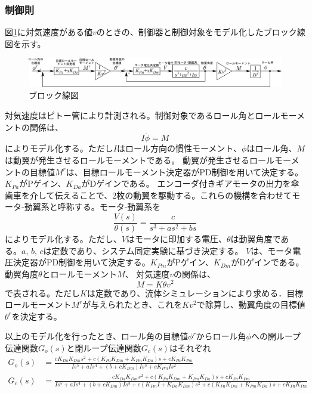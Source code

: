 \documentclass[a4paper,11pt,uplatex]{jsarticle}
\begin{document}
\subsubsection{制御則}
図\ref{fig:ブロック線図}に対気速度がある値$v$のときの、制御器と制御対象をモデル化したブロック線図を示す。
\begin{figure}[H]
	\centering
	\includegraphics[width=0.95\linewidth]{pic_avi/block_diagram.png}
	\caption{ブロック線図}
	\label{fig:ブロック線図}
\end{figure}
対気速度はピトー管により計測される。制御対象であるロール角とロールモーメントの関係は、
\begin{equation}
	I\ddot\phi=M
\end{equation}
によりモデル化する。ただし$I$はロール方向の慣性モーメント、$\phi$はロール角、$M$は動翼が発生させるロールモーメントである。
動翼が発生させるロールモーメントの目標値$M^r$は、目標ロールモーメント決定器がPD制御を用いて決定する。$K_{Pa}$がPゲイン、$K_{Da}$がDゲインである。
エンコーダ付きギアモータの出力を傘歯車を介して伝えることで、2枚の動翼を駆動する。これらの機構を合わせてモータ-動翼系と呼称する。モータ-動翼系を
\begin{equation}
	\frac{V(s)}{\theta(s)}=\frac{c}{s^3+as^2+bs}
\end{equation}
によりモデル化する。ただし、$V$はモータに印加する電圧、$\theta$は動翼角度である。$a,\,b,\,c$は定数であり、システム同定実験に基づき決定する。
$V$は、モータ電圧決定器がPD制御を用いて決定する。$K_{Pm}$がPゲイン、$K_{Dm}$がDゲインである。動翼角度$\theta$とロールモーメント$M$、 対気速度$v$の関係は、
\begin{equation}
	M=K\theta v^2
\end{equation}
で表される。ただし$K$は定数であり、流体シミュレーションにより求める．目標ロールモーメント$M^r$が与えられたとき、これを$Kv^2$で除算し、動翼角度の目標値$\theta^r$を決定する。\par
以上のモデル化を行ったとき、ロール角の目標値$\phi^r$からロール角$\phi$への開ループ伝達関数$G_o(s)$と閉ループ伝達関数$G_c(s)$はそれぞれ
\begin{equation}
	\begin{split}
		G_{o}(s)&=\frac{cK_{Da}K_{Dm}s^2+c\left(K_{Pa}K_{Dm}+K_{Pm}K_{Da}\right)s+cK_{Pa}K_{Pm}}{Is^5+aIs^4+\left(b+cK_{Dm}\right)Is^3+cK_{Pm}Is^2}\\
		G_{c}(s)&=\frac{cK_{Da}K_{Dm}s^2+c\left(K_{Pa}K_{Dm}+K_{Pm}K_{Da}\right)s+cK_{Pa}K_{Pm}}{Is^5+aIs^4+\left(b+cK_{Dm}\right)Is^3+c\left(K_{Pm}I+K_{Da}K_{Dm}\right)s^2+c(K_{Pa}K_{Dm}+K_{Pm}K_{Da})s+cK_{Pa}K_{Pm}}
	\end{split}
\end{equation}
\end{document}
